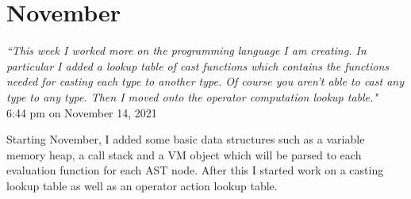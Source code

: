 \documentclass[]{interim}
\theoremstyle{definition}
\begin{document}
\section{November}

\begin{center}
    \textit{``This week I worked more on the programming language I am creating. In particular I added a lookup table of cast functions which contains the functions needed for casting each type to another type. Of course you aren’t able to cast any type to any type. Then I moved onto the operator computation lookup table."}\\[0.5em]
    \tiny{6:44 pm on November 14, 2021}
\end{center}

Starting November, I added some basic data structures such as a variable memory heap, a call stack and a VM object which will be parsed to each evaluation function for each AST node. After this I started work on a casting lookup table as well as an operator action lookup table.

\newpage
\label{endpage}
\printbibliography
\end{document}
